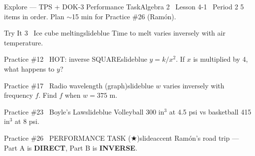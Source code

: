 \documentclass[aspectratio=169, 11pt]{beamer}
\begin{document}
\begin{frame}{Explore --- TPS + DOK-3 Performance Task}{Algebra 2 \textperiodcentered\ Lesson 4-1 \textperiodcentered\ Period 2}
\small\textcolor{slidegray}{5 items in order. Plan \(\sim\)15 min for Practice \#26 (Ramón).}

\vspace{0.15cm}
\begin{projcard}{Try It 3 \textperiodcentered\ Ice cube melting}{slideblue}
Time to melt varies inversely with air temperature.
\end{projcard}
\vspace{-0.15cm}
\begin{projcard}{Practice \#12 \textperiodcentered\ HOT: inverse SQUARE}{slideblue}
\(y = k/x^2\). If \(x\) is multiplied by 4, what happens to \(y\)?
\end{projcard}
\vspace{-0.15cm}
\begin{projcard}{Practice \#17 \textperiodcentered\ Radio wavelength (graph)}{slideblue}
\(w\) varies inversely with frequency \(f\). Find \(f\) when \(w = 375\) m.
\end{projcard}
\vspace{-0.15cm}
\begin{projcard}{Practice \#23 \textperiodcentered\ Boyle's Law}{slideblue}
Volleyball 300 in\(^3\) at 4.5 psi vs basketball 415 in\(^3\) at 8 psi.
\end{projcard}
\vspace{-0.15cm}
\begin{projcard}{Practice \#26 \textperiodcentered\ PERFORMANCE TASK (\(\bigstar\))}{slideaccent}
Ramón's road trip --- Part A is \textbf{DIRECT}, Part B is \textbf{INVERSE}.
\end{projcard}
\end{frame}
\end{document}
